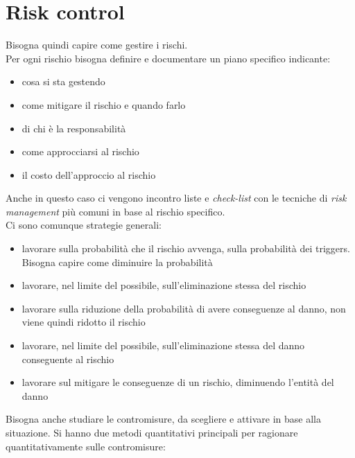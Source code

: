 \documentclass[a4paper,12pt, oneside]{book}
\begin{document}
\section{Risk control}
Bisogna quindi capire come gestire i rischi.\\
Per ogni rischio bisogna definire e documentare un piano specifico indicante:
\begin{itemize}
  \item cosa si sta gestendo
  \item come mitigare il rischio e quando farlo
  \item di chi è la responsabilità
  \item come approcciarsi al rischio
  \item il costo dell'approccio al rischio
\end{itemize}
Anche in questo caso ci vengono incontro liste e \textit{check-list} con le
tecniche di \textit{risk management} più comuni in base al rischio specifico.\\
Ci sono comunque strategie generali:
\begin{itemize}
  \item lavorare sulla probabilità che il rischio avvenga, sulla probabilità dei
  triggers. Bisogna capire come diminuire la probabilità
  \item lavorare, nel limite del possibile, sull'eliminazione stessa del
  rischio
  \item lavorare sulla riduzione della probabilità di avere conseguenze al
  danno, non viene quindi ridotto il rischio
  \item lavorare, nel limite del possibile, sull'eliminazione stessa del danno
  conseguente al rischio
  \item lavorare sul mitigare le conseguenze di un rischio, diminuendo l'entità
  del danno
\end{itemize}
Bisogna anche studiare le contromisure, da scegliere e attivare in base alla
situazione. Si hanno due metodi quantitativi principali per ragionare
quantitativamente sulle contromisure:
\end{document}
